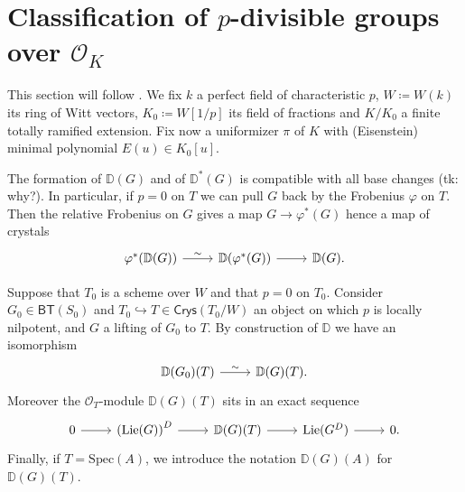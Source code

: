 \documentclass[../Main]{subfiles}
\begin{document}
\section{Classification of \texorpdfstring{$p$}{p}-divisible groups
	over \texorpdfstring{$\mathcal{O}_{ K }$}{the ring of integers of K}}
This section will follow \cite[Appendix A]{Kisin}.
We fix $k$ a perfect field of characteristic $p$,
$W \coloneqq W(k)$ its ring of Witt vectors, $K_0 \coloneqq W[1/p]$
its field of fractions and $K/K_0$ a finite totally ramified extension.
Fix now a uniformizer $\pi$ of $K$ with (Eisenstein) minimal polynomial
$E(u) \in K_0[u]$.


The formation of $\mathbb{D}(G)$ and of $\mathbb{D}^*(G)$ is compatible
with all base changes (tk: why?).
In particular, if $p = 0$ on $T$ we can pull $G$ back by the Frobenius $\varphi$ on $T$.
Then the relative Frobenius on $G$ gives a map $G \to \varphi^*(G)$
hence a map of crystals
\begin{equation*}
\begin{tikzcd}
	\varphi^* (\mathbb{D}(G)) \arrow[r, "\sim", rightarrow] &
	\mathbb{D}(\varphi^*(G)) \arrow[r, "", rightarrow] &
	\mathbb{D}(G)
.\end{tikzcd}
\end{equation*}


\begin{rem}[]
	Suppose that $T_0$ is a scheme over $W$ and that $p = 0$ on $T_0$.
	Consider $G_0 \in \mathsf{BT}(S_0)$ and $T_0 \hookrightarrow T \in \mathsf{Crys}(T_0/W)$
	an object on which $p$ is locally nilpotent, and $G$ a lifting of $G_0$ to $T$.
	By construction of $\mathbb{D}$ we have an isomorphism
	\begin{equation*}
	\begin{tikzcd}[row sep = 0ex
		,/tikz/column 1/.append style={anchor=base east}
		,/tikz/column 2/.append style={anchor=base west}]
		\mathbb{D}(G_0)(T) \arrow[r, "\sim", rightarrow] &
		\mathbb{D}(G)(T)
	.\end{tikzcd}
	\end{equation*} 
	Moreover the $\mathcal{O}_{ T }$-module $\mathbb{D}(G)(T)$ sits in an exact sequence
	\begin{equation*}
	\begin{tikzcd}
		0 \arrow[r, "", rightarrow] &
		\left( \mathrm{Lie}(G) \right)^D \arrow[r, "", rightarrow] &
		\mathbb{D}(G)(T) \arrow[r, "", rightarrow] &
		\mathrm{Lie}(G^D) \arrow[r, "", rightarrow] &
		0
	.\end{tikzcd}
	\end{equation*}
	Finally, if $T = \mathrm{Spec}(A)$, we introduce the notation
	$\mathbb{D}(G)(A)$ for $\mathbb{D}(G)(T)$.
\end{rem}
\end{document}
